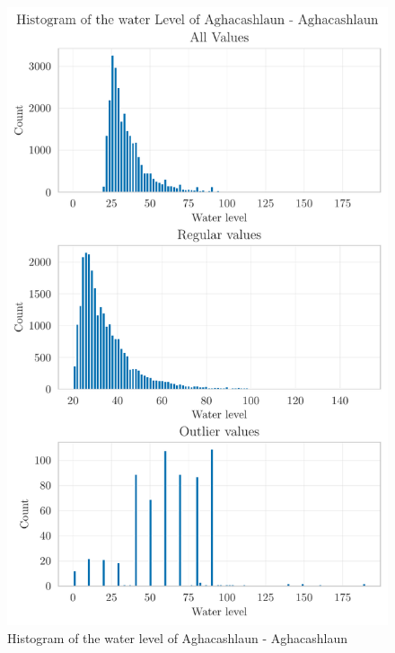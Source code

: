 \begin{figure}[htp]
    \centering 
    \includegraphics{./plots/pdfs/36022-ie/water_level_histogram_36022-ie.pdf}
    \caption{Histogram of the water level of Aghacashlaun - Aghacashlaun}
    \label{figure:water-level-histogram-36022-ie}
\end{figure}

